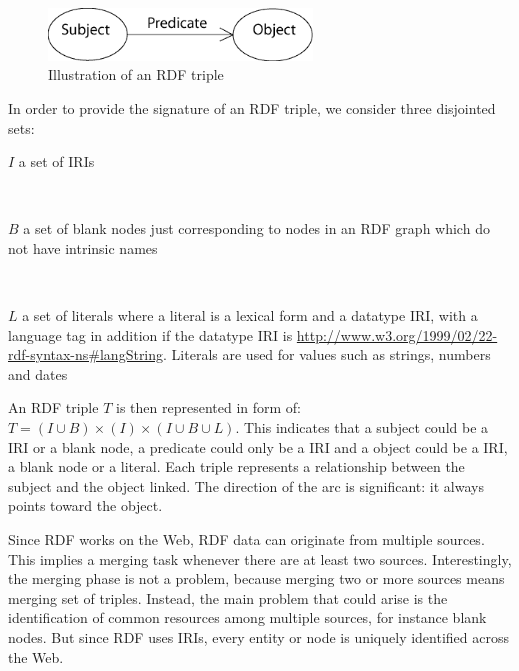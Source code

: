 \documentclass[10pt, a4paper]{report}
\begin{document}
\begin{figure}
	\centering
	\includegraphics[width=7cm]{./assets/img/rdf_triple.png}
	\caption{Illustration of an RDF triple}
	\label{fig:rdf_triple}
	\vspace{0.5cm}
\end{figure}

In order to provide the signature of an RDF triple, we consider three disjointed sets: \\

\begin{itemize}
	\begin{minipage}{0.92\textwidth}
		\item $I$ a set of IRIs \\
	\end{minipage} \\
	\begin{minipage}{0.92\textwidth}
		\item $B$ a set of blank nodes just corresponding to nodes in an RDF graph which do not have intrinsic names \\
	\end{minipage} \\
	\begin{minipage}{0.92\textwidth}
		\item $L$ a set of literals where a literal is a lexical form and a datatype IRI, with a language tag in addition if the datatype IRI is \href{http://www.w3.org/1999/02/22-rdf-syntax-ns\#langString}{http://www.w3.org/1999/02/22-rdf-syntax-ns\#langString}. Literals are used for values such as strings, numbers and dates \\
	\end{minipage}
\end{itemize}

An RDF triple $T$ is then represented in form of: $T = (I \cup B) \times (I) \times (I \cup B \cup L)$. This indicates that a subject could be a IRI or a blank node, a predicate could only be a IRI and a object could be a IRI, a blank node or a literal.
Each triple represents a relationship between the subject and the object linked. The direction of the arc is significant: it always points toward the object.

Since RDF works on the Web, RDF data can originate from multiple sources. This implies a merging task whenever there are at least two sources. Interestingly, the merging phase is not a problem, because merging two or more sources means merging set of triples. Instead, the main problem that could arise is the identification of common resources among multiple sources, for instance blank nodes. But since RDF uses IRIs, every entity or node is uniquely identified across the Web.
\end{document}
